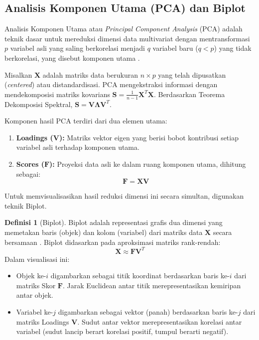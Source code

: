 \documentclass[a4paper]{article}
\theoremstyle{definition} %
\newtheorem{definition}{Definisi}[section]
\begin{document}
\subsection{Analisis Komponen Utama (PCA) dan Biplot}

Analisis Komponen Utama atau \textit{Principal Component Analysis} (PCA) adalah teknik dasar untuk mereduksi dimensi data multivariat dengan mentransformasi $p$ variabel asli yang saling berkorelasi menjadi $q$ variabel baru ($q < p$) yang tidak berkorelasi, yang disebut komponen utama \citep{hotelling1933}.

Misalkan $\mathbf{X}$ adalah matriks data berukuran $n \times p$ yang telah dipusatkan (\textit{centered}) atau distandardisasi. PCA mengekstraksi informasi dengan mendekomposisi matriks kovarians $\mathbf{S} = \frac{1}{n-1}\mathbf{X}^T\mathbf{X}$. Berdasarkan Teorema Dekomposisi Spektral, $\mathbf{S} = \mathbf{V} \mathbf{\Lambda} \mathbf{V}^T$.

Komponen hasil PCA terdiri dari dua elemen utama:
\begin{enumerate}
    \item \textbf{Loadings ($\mathbf{V}$):} Matriks vektor eigen yang berisi bobot kontribusi setiap variabel asli terhadap komponen utama.
    \item \textbf{Scores ($\mathbf{F}$):} Proyeksi data asli ke dalam ruang komponen utama, dihitung sebagai:
    \begin{equation}
        \mathbf{F} = \mathbf{X} \mathbf{V}
    \end{equation}
\end{enumerate}

Untuk memvisualisasikan hasil reduksi dimensi ini secara simultan, digunakan teknik Biplot.

\begin{definition}[Biplot]
	Biplot adalah representasi grafis dua dimensi yang memetakan baris (objek) dan kolom (variabel) dari matriks data $\mathbf{X}$ secara bersamaan \citep{gabriel1971}. Biplot didasarkan pada aproksimasi matriks rank-rendah:
    \begin{equation}
        \mathbf{X} \approx \mathbf{F} \mathbf{V}^T
    \end{equation}
    Dalam visualisasi ini:
    \begin{itemize}
        \item Objek ke-$i$ digambarkan sebagai titik koordinat berdasarkan baris ke-$i$ dari matriks Skor $\mathbf{F}$. Jarak Euclidean antar titik merepresentasikan kemiripan antar objek.
        \item Variabel ke-$j$ digambarkan sebagai vektor (panah) berdasarkan baris ke-$j$ dari matriks Loadings $\mathbf{V}$. Sudut antar vektor merepresentasikan korelasi antar variabel (sudut lancip berart korelasi positif, tumpul berarti negatif).
    \end{itemize}
\end{definition}
\end{document}
